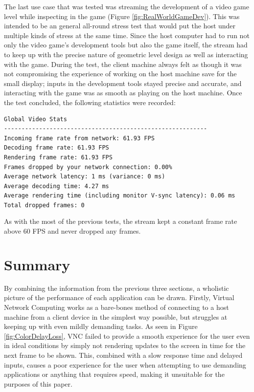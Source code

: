 The last use case that was tested was streaming the development of a video game level while inspecting in the game (Figure \ref{fig:RealWorldGameDev}).
This was intended to be an general all-round stress test that would put the host under multiple kinds of stress at the same time.
Since the host computer had to run not only the video game's development tools but also the game itself, the stream had to keep up with the precise nature of geometric level design as well as interacting with the game.
During the test, the client machine always felt as though it was not compromising the experience of working on the host machine save for the small display; inputs in the development tools stayed precise and accurate, and interacting with the game was as smooth as playing on the host machine.
Once the test concluded, the following statistics were recorded:

\begin{lstlisting}[style=plaintext,title=Statistics recorded while streaming the development of a video game level (Figure \ref{fig:RealWorldGameDev})]
Global Video Stats
----------------------------------------------------------
Incoming frame rate from network: 61.93 FPS
Decoding frame rate: 61.93 FPS
Rendering frame rate: 61.93 FPS
Frames dropped by your network connection: 0.00%
Average network latency: 1 ms (variance: 0 ms)
Average decoding time: 4.27 ms
Average rendering time (including monitor V-sync latency): 0.06 ms
Total dropped frames: 0
\end{lstlisting}

As with the most of the previous tests, the stream kept a constant frame rate above 60 FPS and never dropped any frames.


\section{Summary}\label{sec:EvaluationSummary}

By combining the information from the previous three sections, a wholistic picture of the performance of each application can be drawn. Firstly, Virtual Network Computing works as a bare-bones method of connecting to a host machine from a client device in the simplest way possible, but struggles at keeping up with even mildly demanding tasks.
As seen in Figure \ref{fig:ColorDelayLoss}, VNC failed to provide a smooth experience for the user even in ideal conditions by simply not rendering updates to the screen in time for the next frame to be shown.
This, combined with a slow response time and delayed inputs, causes a poor experience for the user when attempting to use demanding applications or anything that requires speed, making it unsuitable for the purposes of this paper.

